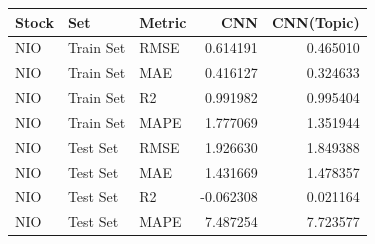 \begin{tabular}{lllrr}
\toprule
Stock & Set & Metric & CNN & CNN(Topic) \\
\midrule
NIO & Train Set & RMSE & 0.614191 & 0.465010 \\
NIO & Train Set & MAE & 0.416127 & 0.324633 \\
NIO & Train Set & R2 & 0.991982 & 0.995404 \\
NIO & Train Set & MAPE & 1.777069 & 1.351944 \\
NIO & Test Set & RMSE & 1.926630 & 1.849388 \\
NIO & Test Set & MAE & 1.431669 & 1.478357 \\
NIO & Test Set & R2 & -0.062308 & 0.021164 \\
NIO & Test Set & MAPE & 7.487254 & 7.723577 \\
\bottomrule
\end{tabular}
